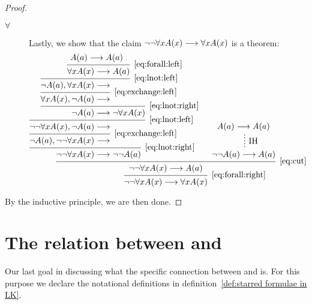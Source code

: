 \documentclass[11pt,a4paper]{article}
\begin{document}
\begin{example}[3.11]
\begin{proof}
\begin{enumerate}
\begin{description}
                    \item[\(\forall\)]
                        Lastly, we show that the claim \(\lnot\lnot\forall xA(x) \longrightarrow \forall xA(x)\) is a theorem:
                        \tiny
                        \begin{equation*}
                            \begin{prooftree}
                                \hypo{A(a)\seq A(a)}
                                \infer1[\eqref{eq:forall:left}]{\forall xA(x)&\seq A(a)}
                                \infer1[\eqref{eq:lnot:left}]{\lnot A(a),\forall xA(x)&\seq}
                                \infer1[\eqref{eq:exchange:left}]{\forall xA(x),\lnot A(a)&\seq}
                                \infer1[\eqref{eq:lnot:right}]{\lnot A(a)&\seq\lnot\forall xA(x)}
                                \infer1[\eqref{eq:lnot:left}]{\lnot\lnot\forall xA(x), \lnot A(a)&\seq}
                                \infer1[\eqref{eq:exchange:left}]{\lnot A(a), \lnot\lnot\forall xA(x)&\seq}
                                \infer1[\eqref{eq:lnot:right}]{\lnot\lnot\forall xA(x)&\seq \lnot\lnot A(a)}
                                \hypo{A(a)\seq A(a)}
                                \ellipsis{\IH}{\lnot\lnot A(a)\seq A(a)}
                                \infer2[\eqref{eq:cut}]{\lnot\lnot\forall xA(x) \seq A(a)}
                                \infer1[\eqref{eq:forall:right}]{\lnot\lnot\forall xA(x) \seq \forall xA(x)}
                            \end{prooftree}
                        \end{equation*}
                        \normalsize
                \end{description}
        \end{enumerate}
        By the inductive principle, we are then done.
    \end{proof}
\end{example}

\section{The relation between \LK{} and \LJ}

Our last goal in discussing what the specific connection between \LK{} and \LJ{} is.
For this purpose we declare the notational definitions in definition~\ref{def:starred formulae in LK}.
\end{document}
